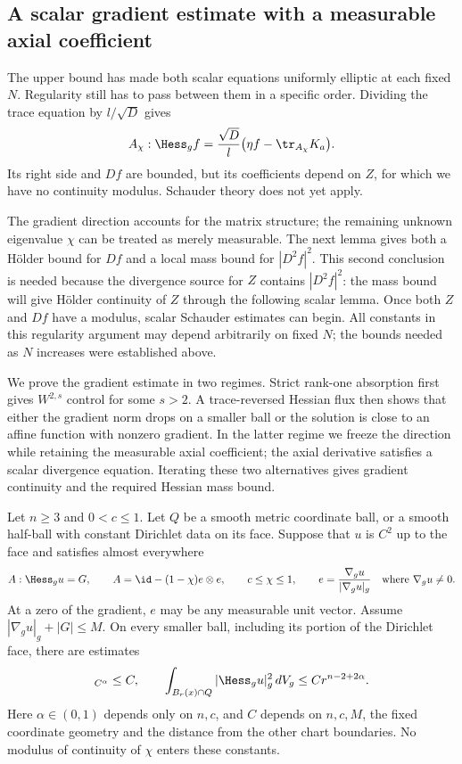 \subsection{A scalar gradient estimate with a measurable axial coefficient}

The upper bound has made both scalar equations uniformly elliptic
at each fixed $N$.  Regularity still has to pass between them in a
specific order.  Dividing the trace equation by $l/\sqrt D$ gives
\[
 A_\chi:\Hess_g f
   =\frac{\sqrt D}{l}\bigl(\eta f-\tr_{A_\chi}K_a\bigr).
\]
Its right side and $Df$ are bounded, but its coefficients depend on
$Z$, for which we have no continuity modulus.  Schauder theory does
not yet apply.

The gradient direction accounts for the matrix structure; the remaining
unknown eigenvalue $\chi$ can be treated as merely measurable.  The next
lemma gives both a H\"older bound for $Df$ and a local mass bound for
$|D^2f|^2$.  This second conclusion is needed because the divergence
source for $Z$ contains $|D^2f|^2$: the mass bound will give H\"older
continuity of $Z$ through the following scalar lemma.  Once both $Z$
and $Df$ have a modulus, scalar Schauder estimates can begin.  All
constants in this regularity argument may depend arbitrarily on fixed
$N$; the bounds needed as $N$ increases were established above.

We prove the gradient estimate in two regimes.  Strict rank-one
absorption first gives $W^{2,s}$ control for some $s>2$.  A
trace-reversed Hessian flux then shows that either the gradient norm
drops on a smaller ball or the solution is close to an affine function
with nonzero gradient.  In the latter regime we freeze the direction
while retaining the measurable axial coefficient; the axial derivative
satisfies a scalar divergence equation.  Iterating these two alternatives
gives gradient continuity and the required Hessian mass bound.

\begin{lemma}
\label{lem:elliptic:gradient}
Let $n\geq3$ and $0<c\leq1$.  Let $Q$ be a smooth metric coordinate ball, or a
smooth half-ball with constant Dirichlet data on its face.  Suppose that
$u$ is $C^2$ up to the face and satisfies almost everywhere
\begin{equation}
 A:\Hess_g u=G,\qquad
 A=\id-(1-\chi)e\otimes e,\qquad
 c\leq\chi\leq1,\qquad
 e=\frac{\nabla_g u}{|\nabla_g u|_g}
 \quad\text{where }\nabla_g u\ne0.
 \label{eq:elliptic:rankone-equation}
\end{equation}
At a zero of the gradient, $e$ may be any measurable unit vector.  Assume
$|\nabla_g u|_g+|G|\leq M$.  On every smaller ball, including its portion
of the Dirichlet face, there are estimates
\begin{equation}
 [Du]_{C^\alpha}\leq C,\qquad
 \int_{B_r(x)\cap Q}|\Hess_g u|_g^2\,dV_g
       \leq C r^{n-2+2\alpha}.
 \label{eq:elliptic:rankone-conclusion}
\end{equation}
Here $\alpha\in(0,1)$ depends only on $n,c$, and $C$ depends on $n,c,M$,
the fixed coordinate geometry and the distance from the other chart
boundaries.  No modulus of continuity of $\chi$ enters these constants.
\end{lemma}


